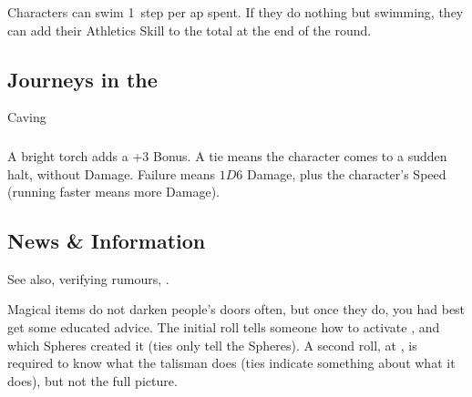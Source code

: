 \begin{multicols}{2}
Characters can swim 1~\gls{step} per \gls{ap} spent.
If they do nothing but swimming, they can add their Athletics Skill to the total at the end of the round.

\subsection{Journeys in the }
Caving 

\subsubsection{}

\subsubsection{}

\subsubsection{}

\subsubsection{}

\subsubsection{}

%
A bright torch adds a +3 Bonus.
A tie means the character comes to a sudden halt, without Damage.
Failure means $1D6$ Damage, plus the character's Speed (running faster means more Damage).

\subsection{News \& Information}

See also, verifying rumours, .

Magical items do not darken people's doors often, but once they do, you had best get some educated advice.
The initial roll tells someone how to activate , and which Spheres created it (ties only tell the Spheres).
A second roll, at \tn[14], is required to know what the \gls{talisman} does (ties indicate something about what it does), but not the full picture.


\end{multicols}
